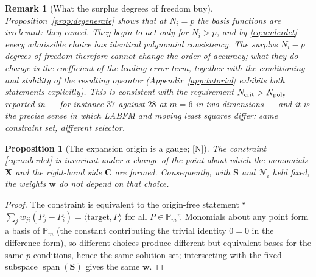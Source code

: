 \documentclass[11pt,a4paper]{article}
\newcommand{\New}{\textcolor{blue!60!black}{\textsf{[N]}}}
\newtheorem{proposition}{Proposition}
\newtheorem{remark}{Remark}
\begin{document}
\begin{remark}[What the surplus degrees of freedom buy]
\label{rem:surplus}
Proposition~\ref{prop:degenerate} shows that at $N_i=p$ the basis functions are
irrelevant: they cancel. They begin to act only for $N_i>p$, and by
\eqref{eq:underdet} every admissible choice has \emph{identical} polynomial
consistency. The surplus $N_i-p$ degrees of freedom therefore cannot change the order of accuracy;
what they do change is the coefficient of the leading error term, together with the
conditioning and stability of the resulting operator (Appendix~\ref{app:tutorial}
exhibits both statements explicitly). This is consistent with the requirement
$N_{\rm crit}>N_{\rm poly}$ reported in \cite[\S 3.2]{KLN2020} --- for instance $37$
against $28$ at $m=6$ in two dimensions --- and it is the precise sense in which LABFM
and moving least squares differ: same constraint set, different selector.
\end{remark}

\begin{proposition}[The expansion origin is a gauge; \New]
\label{prop:gauge}
The constraint \eqref{eq:underdet} is invariant under a change of the point about which
the monomials $\bm X$ and the right-hand side $\bm C$ are formed. Consequently, with
$\bm S$ and $\mathcal N_i$ held fixed, the weights $\bm w$ do not depend on that choice.
\end{proposition}
\begin{proof}
The constraint is equivalent to the origin-free statement ``$\sum_j w_{ji}(P_j-P_i)=
\langle\text{target},P\rangle$ for all $P\in\mathbb P_m$''. Monomials about any point
form a basis of $\mathbb P_m$ (the constant contributing the trivial identity $0=0$ in
the difference form), so different choices produce different but equivalent bases for
the same $p$ conditions, hence the same solution set; intersecting with the fixed
subspace $\operatorname{span}(\bm S)$ gives the same $\bm w$.
\end{proof}
\end{document}
